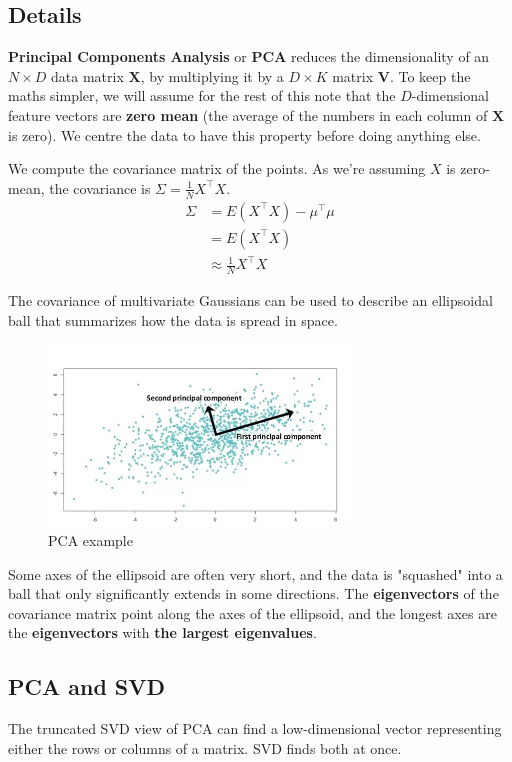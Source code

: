 \documentclass[a3paper, 12pt]{book} %
\begin{document}
\subsection{Details}
\textbf{Principal Components Analysis} or \textbf{PCA} reduces the dimensionality of an $N\times D$ data matrix $\mathbf{X}$, by multiplying it by a $D \times K$ matrix $\mathbf{V}$. To keep the maths simpler, we will assume for the rest of this note that the $D$-dimensional feature vectors are \textbf{zero mean} (the average of the numbers in each column of $\mathbf{X}$ is zero). We centre the data to have this property before doing anything else.

We compute the covariance matrix of the points. As we're assuming $X$ is zero-mean, the covariance is $\Sigma=\frac{1}{N}X^\top X$. 
\begin{equation}
\begin{split}
\Sigma & =E(X^\top X) - \mu^\top \mu \\
& = E(X^\top X) \\
& \approx \frac{1}{N}X^\top X
\end{split}
\end{equation}

The covariance of  multivariate Gaussians can be used to describe an ellipsoidal ball that summarizes how the data is spread in space.\\ 

\begin{figure}[htpb]
	\centering
	\includegraphics[width=8cm]{figures/pca.png}
	\caption{PCA example}
	\label{fig:boat1}
\end{figure}

Some axes of the ellipsoid are often very short, and the data is "squashed" into a ball that only significantly extends in some directions. The \textbf{eigenvectors} of the covariance matrix point along the axes of the ellipsoid, and the longest axes are the \textbf{eigenvectors} with \textbf{the largest eigenvalues}.

\subsection{PCA and SVD}
The truncated SVD view of PCA can find a low-dimensional vector representing either the rows or columns of a matrix. SVD finds both at once.
\end{document}
